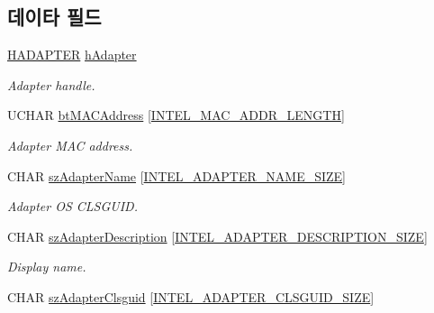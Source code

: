 \subsection*{데이타 필드}
\begin{DoxyCompactItemize}
\item 
\hyperlink{intel__wireless_8hpp_a1ba56f890e3019aba9c5e10c7b1f9196}{H\+A\+D\+A\+P\+T\+ER} \hyperlink{struct_i_n_t_e_l___a_d_a_p_t_e_r___l_i_s_t___e_n_t_r_y_a691881600d67a63fef617bf58a70736c}{h\+Adapter}
\begin{DoxyCompactList}\small\item\em Adapter handle. \end{DoxyCompactList}\item 
U\+C\+H\+AR \hyperlink{struct_i_n_t_e_l___a_d_a_p_t_e_r___l_i_s_t___e_n_t_r_y_af2dc77f7dcbc56f808dab794ecab72d9}{bt\+M\+A\+C\+Address} \mbox{[}\hyperlink{intel__wireless_8hpp_aab812d76eb534e1bf8fa9338c1fa97ff}{I\+N\+T\+E\+L\+\_\+\+M\+A\+C\+\_\+\+A\+D\+D\+R\+\_\+\+L\+E\+N\+G\+TH}\mbox{]}
\begin{DoxyCompactList}\small\item\em Adapter M\+AC address. \end{DoxyCompactList}\item 
C\+H\+AR \hyperlink{struct_i_n_t_e_l___a_d_a_p_t_e_r___l_i_s_t___e_n_t_r_y_a60111ee05a8f654e13c2e8e79a4344f1}{sz\+Adapter\+Name} \mbox{[}\hyperlink{intel__wireless_8hpp_aa5947f7d1fd0296b331f48825431af3e}{I\+N\+T\+E\+L\+\_\+\+A\+D\+A\+P\+T\+E\+R\+\_\+\+N\+A\+M\+E\+\_\+\+S\+I\+ZE}\mbox{]}
\begin{DoxyCompactList}\small\item\em Adapter OS C\+L\+S\+G\+U\+ID. \end{DoxyCompactList}\item 
C\+H\+AR \hyperlink{struct_i_n_t_e_l___a_d_a_p_t_e_r___l_i_s_t___e_n_t_r_y_a9d04dc70c8726729a7ffad68bb8ffb22}{sz\+Adapter\+Description} \mbox{[}\hyperlink{intel__wireless_8hpp_abdb755e97777ea83599ebed6bb7502d0}{I\+N\+T\+E\+L\+\_\+\+A\+D\+A\+P\+T\+E\+R\+\_\+\+D\+E\+S\+C\+R\+I\+P\+T\+I\+O\+N\+\_\+\+S\+I\+ZE}\mbox{]}
\begin{DoxyCompactList}\small\item\em Display name. \end{DoxyCompactList}\item 
C\+H\+AR \hyperlink{struct_i_n_t_e_l___a_d_a_p_t_e_r___l_i_s_t___e_n_t_r_y_a6be5b783565df55995008d952e039b67}{sz\+Adapter\+Clsguid} \mbox{[}\hyperlink{intel__wireless_8hpp_a3524cb39bf8621e7f78bfda1d2f690ad}{I\+N\+T\+E\+L\+\_\+\+A\+D\+A\+P\+T\+E\+R\+\_\+\+C\+L\+S\+G\+U\+I\+D\+\_\+\+S\+I\+ZE}\mbox{]}

\end{DoxyCompactItemize}
